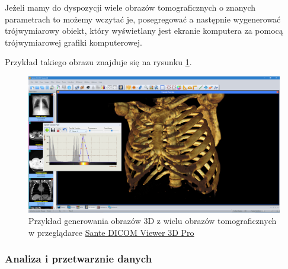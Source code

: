 Jeżeli mamy do dyspozycji wiele obrazów tomograficznych o znanych parametrach to możemy wczytać je, posegregować a następnie wygenerować trójwymiarowy obiekt, który wyświetlany jest ekranie komputera za pomocą trójwymiarowej grafiki komputerowej.

Przykład takiego obrazu znajduje się na rysunku \ref{fig:dicomviewer002}.

\begin{figure}[!htbp]
    \centering
    \includegraphics[width=\textwidth]{img/dicom-viewer-002.png}
    \caption{Przykład generowania obrazów 3D z wielu obrazów tomograficznych w przeglądarce \href{https://www.santesoft.com/win/sante-dicom-viewer-3d-pro/sante-dicom-viewer-3d-pro.html}{Sante DICOM Viewer 3D Pro}}
    \label{fig:dicomviewer002}
\end{figure}

\subsubsection{Analiza i przetwarznie danych}

